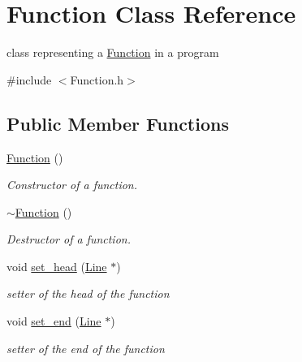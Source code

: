 \hypertarget{class_function}{}\section{Function Class Reference}
\label{class_function}


class representing a \mbox{\hyperlink{class_function}{Function}} in a program  




{\ttfamily \#include $<$Function.\+h$>$}

\subsection*{Public Member Functions}
\begin{DoxyCompactItemize}
\item 
\mbox{\label{class_function_ae206568fd4fd4c885e3ccff76345c4e6}} 
\mbox{\hyperlink{class_function_ae206568fd4fd4c885e3ccff76345c4e6}{Function}} ()
\begin{DoxyCompactList}\small\item\em Constructor of a function. \end{DoxyCompactList}\item 
\mbox{\label{class_function_a3b03f7cf0b75d16edebdda1dee1db6fd}} 
\mbox{\hyperlink{class_function_a3b03f7cf0b75d16edebdda1dee1db6fd}{$\sim$\+Function}} ()
\begin{DoxyCompactList}\small\item\em Destructor of a function. \end{DoxyCompactList}\item 
\mbox{\label{class_function_a67ffa7175c8ab513df6db299b877ad97}} 
void \mbox{\hyperlink{class_function_a67ffa7175c8ab513df6db299b877ad97}{set\+\_\+head}} (\mbox{\hyperlink{class_line}{Line}} $\ast$)
\begin{DoxyCompactList}\small\item\em setter of the head of the function \end{DoxyCompactList}\item 
\mbox{\label{class_function_af5b88d118098c4cd6e5e3a4d324b8b48}} 
void \mbox{\hyperlink{class_function_af5b88d118098c4cd6e5e3a4d324b8b48}{set\+\_\+end}} (\mbox{\hyperlink{class_line}{Line}} $\ast$)
\begin{DoxyCompactList}\small\item\em setter of the end of the function \end{DoxyCompactList}\item 

\end{DoxyCompactItemize}
